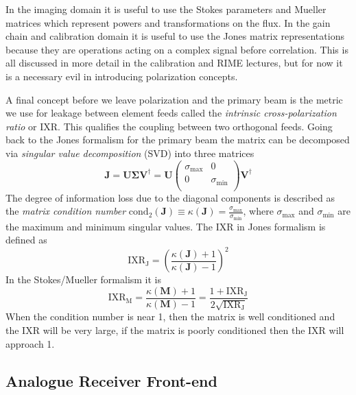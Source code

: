 \documentclass[usenatbib,usegraphicx]{article}
\begin{document}
In the imaging domain it is useful to use the Stokes parameters and Mueller matrices which represent powers and transformations on the flux.
In the gain chain and calibration domain it is useful to use the Jones matrix representations because they are operations acting on a complex signal before correlation.
This is all discussed in more detail in the calibration and RIME lectures, but for now it is a necessary evil in introducing polarization concepts.

A final concept before we leave polarization and the primary beam is the metric we use for leakage between element feeds called the \emph{intrinsic cross-polarization ratio} or IXR.
This qualifies the coupling between two orthogonal feeds.
Going back to the Jones formalism for the primary beam the matrix can be decomposed via \emph{singular value decomposition} (SVD) into three matrices
%
\begin{equation}
\label{eq:svd}
\mathbf{J} = \mathbf{U} \mathbf{\Sigma} \mathbf{V}^{\dagger} = \mathbf{U}
\begin{pmatrix}
    \sigma_{\text{max}} & 0\\
    0 & \sigma_{\text{min}}\\
\end{pmatrix}
\mathbf{V}^{\dagger}
\end{equation}
%
The degree of information loss due to the diagonal components is described as the \emph{matrix condition number}
$\textrm{cond}_2(\mathbf{J}) \equiv \kappa(\mathbf{J})=\frac{\sigma_{\text{max}}}{\sigma_{\text{min}}}$,
where $\sigma_{\text{max}}$ and $\sigma_{\text{min}}$ are the maximum and minimum singular values.
The IXR in Jones formalism is defined as
%
\begin{equation}
\label{eq:ixr_def_kappa}
\textrm{IXR}_{\text{J}} = \left ( \frac{\kappa(\mathbf{J}) + 1}{\kappa(\mathbf{J}) -1} \right )^2
\end{equation}
%
In the Stokes/Mueller formalism it is
%
\begin{equation}
\label{eq:ixr_m_ixr_rel}
\textrm{IXR}_{\text{M}} = \frac{\kappa(\mathbf{M})+1}{\kappa(\mathbf{M})-1} = \frac{1 + \textrm{IXR}_{\text{J}}}{2 \sqrt{\textrm{IXR}_{\text{J}}}}
\end{equation}
%
When the condition number is near 1, then the matrix is well conditioned and the IXR will be very large, if the matrix is poorly conditioned then the IXR will approach 1.

\subsection{Analogue Receiver Front-end}
\end{document}
